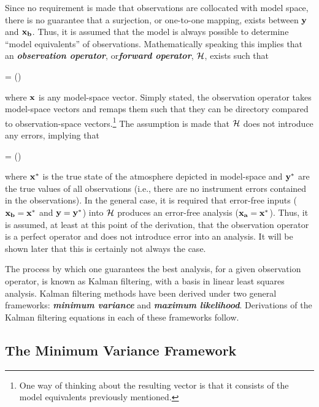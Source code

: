 Since no requirement is made that observations are collocated with model space, there is no guarantee that a surjection, or one-to-one mapping, exists between $\mathbf{y}$ and $\mathbf{x_b}$. Thus, it is assumed that the model is always possible to determine ``model equivalents'' of observations. Mathematically speaking this implies that an \emph{\textbf{observation operator}}, or\emph{\textbf{forward operator}}, $\mathcal{H}$, exists such that


    \be
        \label{observation operator}
         = ()
    \ee


\noindent where $\mathbf{x}$ is any model-space vector. Simply stated, the observation operator takes model-space vectors and remaps them such that they can be directory compared to observation-space vectors.\footnote{One way of thinking about the resulting vector is that it consists of the model equivalents previously mentioned.} The assumption is made that $\mathcal{H}$ does not introduce any errors, implying that


    \be
        \label{perfect observation operator}
         = ()
    \ee


\noindent where $\mathbf{x^*}$ is the true state of the atmosphere depicted in model-space and $\mathbf{y^*}$ are the true values of all observations (i.e., there are no instrument errors contained in the observations). In the general case, it is required that error-free inputs ($\mathbf{x_b} = \mathbf{x^*}$ and $\mathbf{y} = \mathbf{y^*}$) into $\mathcal{H}$ produces an error-free analysis ($\mathbf{x_a}=\mathbf{x^*}$). Thus, it is assumed, at least at this point of the derivation, that the observation operator is a perfect operator and does not introduce error into an analysis. It will be shown later that this is certainly not always the case.


The process by which one guarantees the best analysis, for a given observation operator, is known as Kalman filtering, with a basis in linear least squares analysis.  Kalman filtering methods have been derived under two general frameworks: \emph{\textbf{minimum variance}} and \emph{\textbf{maximum likelihood}}. Derivations of the Kalman filtering equations in each of these frameworks follow.




\subsection{The Minimum Variance Framework}
\label{The Minimum Variance Framework}

